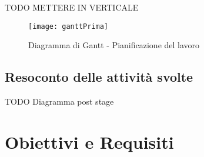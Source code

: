 TODO METTERE IN VERTICALE
\begin{figure}[!h] 
    \centering 
    \texttt{[image: ganttPrima]} 
    \caption{Diagramma di Gantt - Pianificazione del lavoro}
\end{figure}

\subsection{Resoconto delle attività svolte}

TODO Diagramma post stage

\section{Obiettivi e Requisiti}

